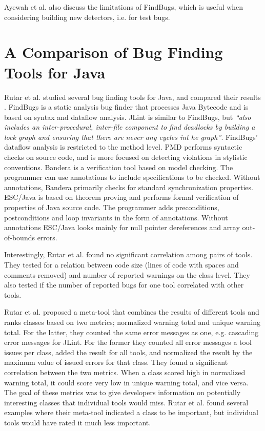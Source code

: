 \documentclass{uvamscse}
\newcommand{\AFBEval}{Ayewah et al.}
\newcommand{\AComparisonBugTools}{Rutar et al.}
\begin{document}
\AFBEval{} also discuss the limitations of FindBugs, which is useful when considering building new detectors, i.e. for test bugs.

\section{A Comparison of Bug Finding Tools for Java}
\AComparisonBugTools{} studied several bug finding tools for Java, and compared their results \cite{rutar2004comparison}. FindBugs is a static analysis bug finder that processes Java Bytecode and is based on syntax and dataflow analysis. JLint is similar to FindBugs, but \textit{``also includes an inter-procedural, inter-file component to find deadlocks by building a lock graph and ensuring that there are never any cycles int he graph''}. FindBugs' dataflow analysis is restricted to the method level. PMD performs syntactic checks on source code, and is more focused on detecting violations in stylistic conventions. Bandera is a verification tool based on model checking. The programmer can use annotations to include specifications to be checked. Without annotations, Bandera primarily checks for standard synchronization properties. ESC/Java is based on theorem proving and performs formal verification of properties of Java source code. The programmer adds preconditions, postconditions and loop invariants in the form of annotations. Without annotations ESC/Java looks mainly for null pointer dereferences and array out-of-bounds errors. 

Interestingly, \AComparisonBugTools{} found no significant correlation among pairs of tools. They tested for a relation between code size (lines of code with spaces and comments removed) and number of reported warnings on the class level. They also tested if the number of reported bugs for one tool correlated with other tools. 

\AComparisonBugTools{} proposed a meta-tool that combines the results of different tools and ranks classes based on two metrics; normalized warning total and unique warning total. For the latter, they counted the same error messages as one, e.g. cascading error messages for JLint. For the former they counted all error messages a tool issues per class, added the result for all tools, and normalized the result by the maximum value of issued errors for that class. They found a significant correlation between the two metrics. When a class scored high in normalized warning total, it could score very low in unique warning total, and vice versa. The goal of these metrics was to give developers information on potentially interesting classes that individual tools would miss. \AComparisonBugTools{} found several examples where their meta-tool indicated a class to be important, but individual tools would have rated it much less important.
\end{document}
